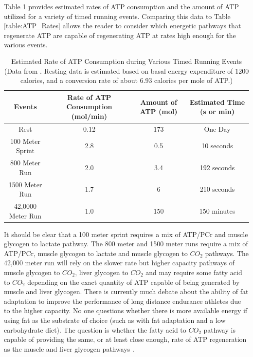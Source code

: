 Table \ref{table:Event_ATP_Rates} provides estimated rates of ATP consumption and the amount of ATP utilized for a variety of timed running events. Comparing this data to Table \ref{table:ATP_Rates} allows the reader to consider which energetic pathways that regenerate ATP are capable of regenerating ATP at rates high enough for the various events.


\begin{table}[h!]
\centering
\begin{tabular}{||c c c c||} 
 \hline
Events & Rate of ATP Consumption (mol/min) & Amount of ATP (mol) & Estimated Time (s or min)\\ [0.5ex] 
 \hline\hline
 Rest & 0.12  & 173 & One Day \\
 100 Meter Sprint & 2.8 & 0.5 & 10 seconds \\ 
 800 Meter Run & 2.0 & 3.4 & 192 seconds\\
 1500 Meter Run & 1.7 & 6 & 210 seconds \\ 
 42,0000 Meter Run & 1.0 & 150 & 150 minutes \\[1ex] 
 \hline
\end{tabular}
\caption{Estimated Rate of ATP Consumption during Various Timed Running Events (\footnotesize{Data from \cite{feher_quantitative_2017}. Resting data is estimated based on basal energy expenditure of 1200 calories, and a conversion rate of about 6.93 calories per mole of ATP.})}
\label{table:Event_ATP_Rates}
\end{table}
 
It should be clear that a 100 meter sprint requires a mix of ATP/PCr and muscle glycogen to lactate pathway. The 800 meter and 1500 meter runs require a mix of ATP/PCr, muscle glycogen to lactate and muscle glycogen to $CO_2$ pathways. The 42,000 meter run will rely on the slower rate but higher capacity pathways of muscle glycogen to $CO_2$, liver glycogen to $CO_2$ and may require some fatty acid to $CO_2$ depending on the exact quantity of ATP capable of being generated by muscle and liver glycogen. There is currently much debate about the ability of fat adaptation to improve the performance of long distance endurance athletes due to the higher capacity. No one questions whether there is more available energy if using fat as the substrate of choice (such as with fat adaptation and a low carbohydrate diet). The question is whether the fatty acid to $CO_2$ pathway is capable of providing the same, or at least close enough, rate of ATP regeneration as the muscle and liver glycogen pathways \cite{}. %

